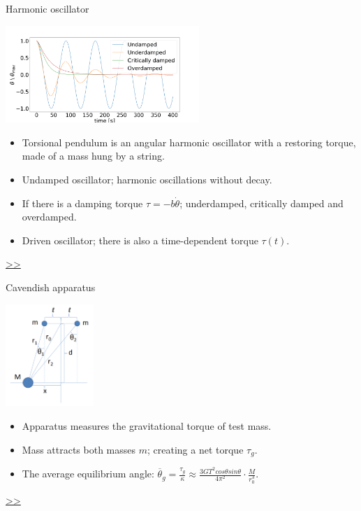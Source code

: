\documentclass{beamer}
\begin{document}
\begin{frame}{\hypertarget{frame:Harmonic oscillator}{Harmonic oscillator}}
	\begin{center}		
		\includegraphics[width=0.55\textwidth,keepaspectratio]{damp.png}
    \end{center}
	\begin{itemize}

		\item Torsional pendulum is an angular harmonic oscillator with a restoring torque, made of a mass hung by a string. 
		\item Undamped oscillator; harmonic oscillations without decay.
		\item If there is a damping torque $\tau = -b\dot{\theta}$; underdamped, critically damped and overdamped.
		\item Driven oscillator; there is also a time-dependent torque $\tau(t)$.
		
	\end{itemize}
	\hyperlink{frame:Damped oscillator}{>>}
\end{frame}


\begin{frame}{\hypertarget{frame:Cavendish apparatus}{Cavendish apparatus}}
	\begin{center}		
		\includegraphics[width=0.25\textwidth,keepaspectratio]{Cavendish apparatus.PNG}
    \end{center}
	\begin{itemize}
		\item Apparatus measures the gravitational torque of test mass.
		\item Mass attracts both masses $m$; creating a net torque $\tau_g$.
		\item The average equilibrium angle: $\overline{\theta}_g = \frac{\tau_g}{\kappa} \approx \frac{3GT^2cos\theta sin\theta}{4\pi^2 } \cdot \frac{M}{r_0^3}$.

	\end{itemize}
	\hyperlink{frame:Cavendish apparatus 1}{>>} 
\end{frame}
\end{document}
